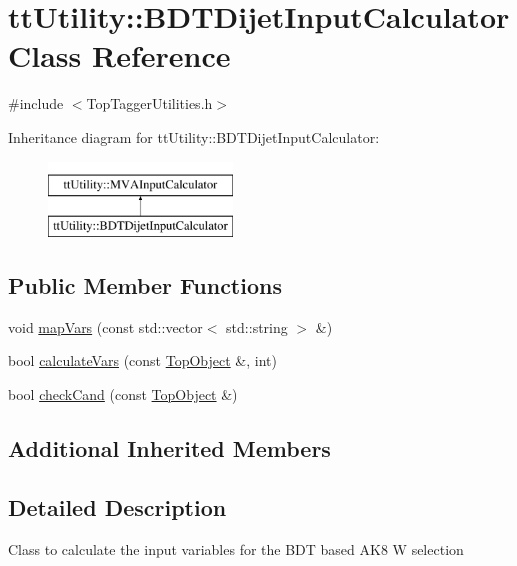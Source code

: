 \hypertarget{classttUtility_1_1BDTDijetInputCalculator}{\section{tt\-Utility\-:\-:B\-D\-T\-Dijet\-Input\-Calculator Class Reference}
\label{classttUtility_1_1BDTDijetInputCalculator}
}


{\ttfamily \#include $<$Top\-Tagger\-Utilities.\-h$>$}

Inheritance diagram for tt\-Utility\-:\-:B\-D\-T\-Dijet\-Input\-Calculator\-:\begin{figure}[H]
\begin{center}
\leavevmode
\includegraphics[height=2.000000cm]{classttUtility_1_1BDTDijetInputCalculator}
\end{center}
\end{figure}
\subsection*{Public Member Functions}
\begin{DoxyCompactItemize}
\item 
void \hyperlink{classttUtility_1_1BDTDijetInputCalculator_a8b3197ff6ced189b17e3d666ef8f24a7}{map\-Vars} (const std\-::vector$<$ std\-::string $>$ \&)
\item 
bool \hyperlink{classttUtility_1_1BDTDijetInputCalculator_aabe1eff89a230cc1a02606eaadc74fdc}{calculate\-Vars} (const \hyperlink{classTopObject}{Top\-Object} \&, int)
\item 
bool \hyperlink{classttUtility_1_1BDTDijetInputCalculator_a2832dae8ebcb1572c05379776c67d4ef}{check\-Cand} (const \hyperlink{classTopObject}{Top\-Object} \&)
\end{DoxyCompactItemize}
\subsection*{Additional Inherited Members}


\subsection{Detailed Description}
Class to calculate the input variables for the B\-D\-T based A\-K8 W selection 

